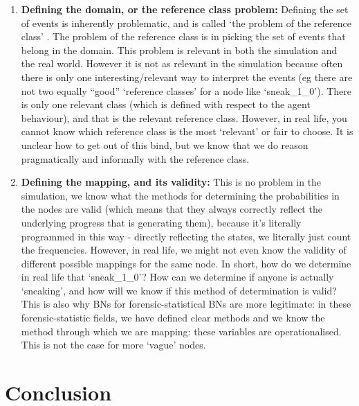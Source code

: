 \documentclass[12pt]{article}
\begin{document}
\begin{enumerate}
\begin{enumerate}
\item \textbf{Defining the domain, or the reference class problem:} Defining the set of events is inherently problematic, and is called `the problem of the reference class' \citep{colyvan2001}. The problem of the reference class is in picking the set of events that belong in the domain. This problem is relevant in both the simulation and the real world.  However it is not as relevant in the simulation because often there is only one interesting/relevant way to interpret the events (eg there are not two equally ``good'' `reference classes' for a node like `sneak\_1\_0'). There is only one relevant class (which is defined with respect to the agent behaviour), and that is the relevant reference class. However, in real life, you cannot know which reference class is the most `relevant' or fair to choose. It is unclear how to get out of this bind, but we know that we do reason pragmatically and informally with the reference class.
\item \textbf{Defining the mapping, and its validity:} This is no problem in the simulation, we know what the methods for determining the probabilities in the nodes are valid (which means that they always correctly reflect the underlying progress that is generating them), because it's literally programmed in this way - directly reflecting the states, we literally just count the frequencies. However, in real life, we might not even know the validity of different possible mappings for the same node. In short, how do we determine in real life that `sneak\_1\_0'? How can we determine if anyone is actually `sneaking', and how will we know if this method of determination is valid? This is also why BNs for forensic-statistical BNs are more legitimate: in these forensic-statistic fields, we have defined clear methods and we know the method through which we are mapping: these variables are operationalised. This is not the case for more `vague' nodes.
\end{enumerate}
\end{enumerate}



\section{Conclusion}
\end{document}
